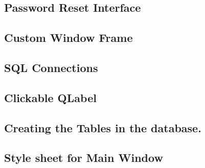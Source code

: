 \begin{landscape}
\subsection{Password Reset Interface}
\begin{figure}[H]
\end{figure}

\subsection{Custom Window Frame}
\begin{figure}[H]
\end{figure}

\subsection{SQL Connections}
\begin{figure}[H]
\end{figure}

\subsection{Clickable QLabel}
\begin{figure}[H]
\end{figure}

\subsection{Creating the Tables in the database.}
\begin{figure}[H]
\end{figure}


\subsection{Style sheet for Main Window}
\begin{figure}[H]
\end{figure}

\end{landscape}
